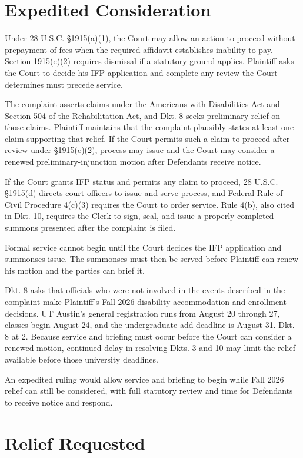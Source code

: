 \documentclass[12pt]{article}
\begin{document}
\section*{Expedited Consideration}

Under 28 U.S.C. \S 1915(a)(1), the Court may allow an action to proceed without prepayment of fees when the required affidavit establishes inability to pay. Section 1915(e)(2) requires dismissal if a statutory ground applies. Plaintiff asks the Court to decide his IFP application and complete any review the Court determines must precede service.

The complaint asserts claims under the Americans with Disabilities Act and Section 504 of the Rehabilitation Act, and Dkt. 8 seeks preliminary relief on those claims. Plaintiff maintains that the complaint plausibly states at least one claim supporting that relief. If the Court permits such a claim to proceed after review under \S 1915(e)(2), process may issue and the Court may consider a renewed preliminary-injunction motion after Defendants receive notice.

If the Court grants IFP status and permits any claim to proceed, 28 U.S.C. \S 1915(d) directs court officers to issue and serve process, and Federal Rule of Civil Procedure 4(c)(3) requires the Court to order service. Rule 4(b), also cited in Dkt. 10, requires the Clerk to sign, seal, and issue a properly completed summons presented after the complaint is filed.

Formal service cannot begin until the Court decides the IFP application and summonses issue. The summonses must then be served before Plaintiff can renew his motion and the parties can brief it.

Dkt. 8 asks that officials who were not involved in the events described in the complaint make Plaintiff's Fall 2026 disability-accommodation and enrollment decisions. UT Austin's general registration runs from August 20 through 27, classes begin August 24, and the undergraduate add deadline is August 31. Dkt. 8 at 2. Because service and briefing must occur before the Court can consider a renewed motion, continued delay in resolving Dkts. 3 and 10 may limit the relief available before those university deadlines.

An expedited ruling would allow service and briefing to begin while Fall 2026 relief can still be considered, with full statutory review and time for Defendants to receive notice and respond.

\section*{Relief Requested}
\end{document}
